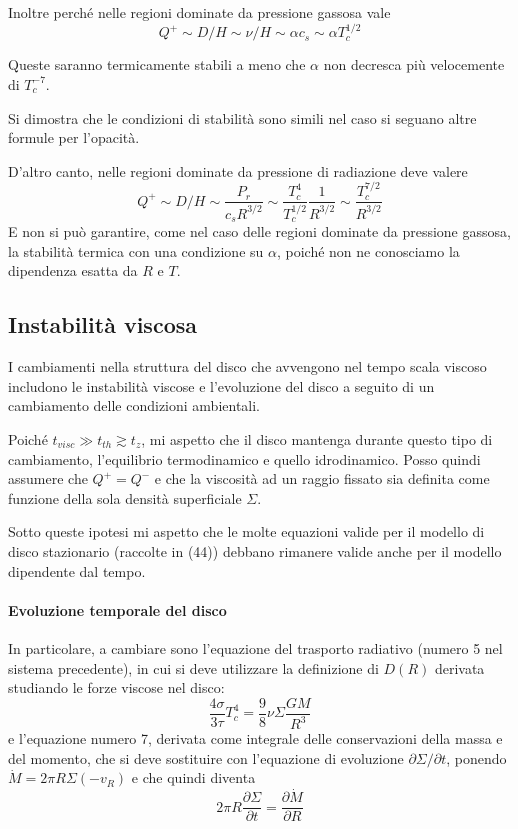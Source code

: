 \documentclass[a4paperbi]{article}
\begin{document}
	Inoltre perché nelle regioni dominate da pressione gassosa vale
	\begin{equation}
		Q^+\sim D/H\sim \nu/H\sim\alpha c_s\sim\alpha T_c^{1/2}
	\end{equation}		
	
	Queste saranno termicamente stabili a meno che $\alpha$ non decresca più velocemente di $T_c^{-7}$.
	
	Si dimostra che le condizioni di stabilità sono simili nel caso si seguano altre formule per l'opacità.
	
	D'altro canto, nelle regioni dominate da pressione di radiazione deve valere 
	\begin{equation}
		Q^+\sim D/H\sim\frac{P_r}{c_s R^{3/2}}\sim\frac{T_c^4}{T_c^{1/2}}\frac{1}{R^{3/2}}\sim\frac{T_c^{7/2}}{R^{3/2}}
	\end{equation}
	E non si può garantire, come nel caso delle regioni dominate da pressione gassosa, la stabilità termica con una condizione su $\alpha$, poiché non ne conosciamo la dipendenza esatta da $R$ e $T$.

\subsection{Instabilità viscosa}
	I cambiamenti nella struttura del disco che avvengono nel tempo scala viscoso includono le instabilità viscose e l'evoluzione del disco a seguito di un cambiamento delle condizioni ambientali.
	
	Poiché $t_{visc}\gg t_{th}\gtrsim t_z$, mi aspetto che il disco mantenga durante questo tipo di cambiamento, l'equilibrio termodinamico e quello idrodinamico. Posso quindi assumere che $Q^+=Q^-$ e che la viscosità ad un raggio fissato sia definita come funzione della sola densità superficiale $\Sigma$. 
	
	Sotto queste ipotesi mi aspetto che le molte equazioni valide per il modello di disco stazionario (raccolte in (44))  debbano rimanere valide anche per il modello dipendente dal tempo. 
	
	\paragraph{Evoluzione temporale del disco}
	In particolare, a cambiare sono l'equazione del trasporto radiativo (numero 5 nel sistema precedente), in cui si deve utilizzare la definizione di $D(R)$ derivata studiando le forze viscose nel disco:
	\begin{equation}
		\frac{4\sigma}{3\tau}T_c^4=\frac{9}{8}\nu\Sigma\frac{GM}{R^3}
	\end{equation}
	e l'equazione numero 7, derivata come integrale delle conservazioni della massa e del momento, che si deve sostituire con l'equazione di evoluzione $\partial \Sigma/\partial t$, ponendo $\dot{M}=2\pi R\Sigma(-v_R)$ e che quindi diventa
	\begin{equation}
		2\pi R\frac{\partial \Sigma}{\partial t}=\frac{\partial\dot{M}}{\partial R}
	\end{equation}
	
\end{document}
